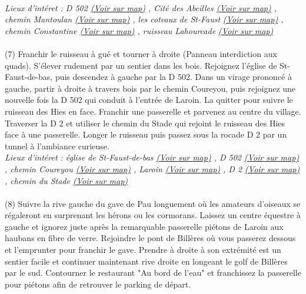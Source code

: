 \documentclass{article}
\begin{document}
        \\\emph{Lieux d'intéret : D 502 
        \href{https://www.google.com/maps/?q=43.287530, -0.391115}{(Voir sur map)}
        , Cité des Abeilles 
        \href{https://www.google.com/maps/?q=43.287530, -0.391115}{(Voir sur map)}
        , chemin Mantoulan 
        \href{https://www.google.com/maps/?q=43.287530, -0.391115}{(Voir sur map)}
        , les coteaux de St-Faust 
        \href{https://www.google.com/maps/?q=43.287530, -0.391115}{(Voir sur map)}
        , chemin Constantine 
        \href{https://www.google.com/maps/?q=43.287530, -0.391115}{(Voir sur map)}
        , ruisseau Lahourcade 
        \href{https://www.google.com/maps/?q=43.287530, -0.391115}{(Voir sur map)}
        }\\~\\
(7)\indent
            Franchir le ruisseau à gué et tourner à droite (Panneau interdiction aux quads). S'élever rudement par un sentier dans les bois. Rejoignez l'église de St-Faust-de-bas, puis descendez à gauche par la D 502. Dans un virage prononcé à gauche, partir à droite à travers bois par le chemin Coureyou, puis rejoignez une nouvelle fois la D 502 qui conduit à l'entrée de Laroin. La quitter pour suivre le ruisseau des Hies en face. Franchir une passerelle et parvenez au centre du village. Traverser la D 2 et utiliser le chemin du Stade qui rejoint le ruisseau des Hies face à une passerelle. Longer le ruisseau puis passez sous la rocade D 2 par un tunnel à l'ambiance curieuse. 
        \\\emph{Lieux d'intéret : église de St-Faust-de-bas 
        \href{https://www.google.com/maps/?q=43.287530, -0.391115}{(Voir sur map)}
        , D 502 
        \href{https://www.google.com/maps/?q=43.287530, -0.391115}{(Voir sur map)}
        , chemin Coureyou 
        \href{https://www.google.com/maps/?q=43.287530, -0.391115}{(Voir sur map)}
        , Laroin 
        \href{https://www.google.com/maps/?q=43.287530, -0.391115}{(Voir sur map)}
        , D 2 
        \href{https://www.google.com/maps/?q=43.287530, -0.391115}{(Voir sur map)}
        , chemin du Stade 
        \href{https://www.google.com/maps/?q=43.287530, -0.391115}{(Voir sur map)}
        }\\~\\
(8)\indent
            Suivre la rive gauche du gave de Pau longuement où les amateurs d'oiseaux se régaleront en surprenant les hérons ou les cormorans. Laissez un centre équestre à gauche et ignorez juste après la remarquable passerelle piétons de Laroin aux haubans en fibre de verre. Rejoindre le pont de Billères où vous passerez dessous et l'emprunter pour franchir le gave. Prendre à droite à son extrémité est un sentier facile et continuer maintenant rive droite en longeant le golf de Billères par le sud. Contourner le restaurant "Au bord de l'eau" et franchissez la passerelle pour piétons afin de retrouver le parking de départ.
\end{document}
